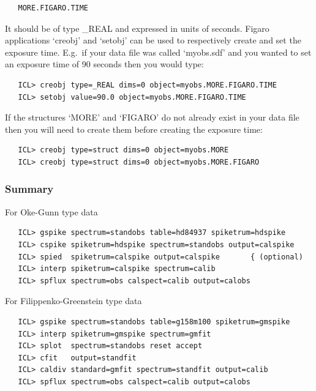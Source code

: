 \begin{verbatim}
   MORE.FIGARO.TIME
\end{verbatim}

It should be of type \_REAL and expressed in units of seconds.  Figaro
applications `creobj' and `setobj' can be used to respectively create
and set the exposure time.  E.g.\ if your data file was called `myobs.sdf'
and you wanted to set an exposure time of 90 seconds then you would type:

\begin{verbatim}
   ICL> creobj type=_REAL dims=0 object=myobs.MORE.FIGARO.TIME
   ICL> setobj value=90.0 object=myobs.MORE.FIGARO.TIME
\end{verbatim}

If the structures `MORE' and `FIGARO' do not already exist in your
data file then you will need to create them before creating the exposure
time:

\begin{verbatim}
   ICL> creobj type=struct dims=0 object=myobs.MORE
   ICL> creobj type=struct dims=0 object=myobs.MORE.FIGARO
\end{verbatim}


\subsubsection{\label{techno5summary}Summary}

   For Oke-Gunn type data\latorhtm{---}{-}

\begin{verbatim}
   ICL> gspike spectrum=standobs table=hd84937 spiketrum=hdspike
   ICL> cspike spiketrum=hdspike spectrum=standobs output=calspike
   ICL> spied  spiketrum=calspike output=calspike       { (optional)
   ICL> interp spiketrum=calspike spectrum=calib
   ICL> spflux spectrum=obs calspect=calib output=calobs
\end{verbatim}

   For Filippenko-Greenstein type data\latorhtm{---}{-}

\begin{verbatim}
   ICL> gspike spectrum=standobs table=g158m100 spiketrum=gmspike
   ICL> interp spiketrum=gmspike spectrum=gmfit
   ICL> splot  spectrum=standobs reset accept
   ICL> cfit   output=standfit
   ICL> caldiv standard=gmfit spectrum=standfit output=calib
   ICL> spflux spectrum=obs calspect=calib output=calobs
\end{verbatim}


